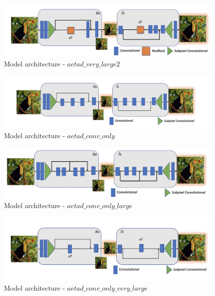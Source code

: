 \begin{figure}[!ht]
\centering
\includegraphics[width=14cm]{figures/architecture_very_large2.png}
\caption{Model architecture - $aetad\_very\_large2$}
\end{figure}


\begin{figure}[!ht]
\centering
\includegraphics[width=14cm]{figures/architecture_conv_only.png}
\caption{Model architecture - $aetad\_conv\_only$}
\end{figure}

\begin{figure}[!ht]
\centering
\includegraphics[width=14cm]{figures/architecture_conv_only_large.png}
\caption{Model architecture - $aetad\_conv\_only\_large$}
\end{figure}

\begin{figure}[!ht]
\centering
\includegraphics[width=14cm]{figures/architecture_conv_only_very_large.png}
\caption{Model architecture - $aetad\_conv\_only\_very\_large$}
\end{figure}


